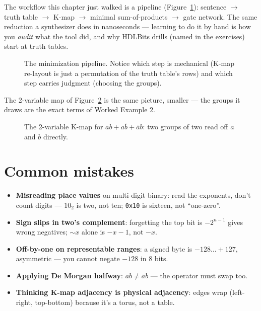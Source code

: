 The workflow this chapter just walked is a pipeline
(Figure~\ref{fig:pipeline}): sentence $\to$ truth table $\to$ K-map
$\to$ minimal sum-of-products $\to$ gate network. The same reduction a
synthesizer does in nanoseconds — learning to do it by hand is how you
\emph{audit} what the tool did, and why HDLBits drills (named in the
exercises) start at truth tables.

\begin{figure}[htbp]
\centering

\caption{The minimization pipeline. Notice which step is mechanical
(K-map re-layout is just a permutation of the truth table's rows) and
which step carries judgment (choosing the groups).}
\label{fig:pipeline}
\end{figure}

The 2-variable map of Figure~\ref{fig:kmap2} is the same picture,
smaller — the groups it draws are the exact terms of Worked Example 2.

\begin{figure}[htbp]
\centering

\caption{The 2-variable K-map for $ab+a\bar b+\bar ab$: two groups of two
read off $a$ and $b$ directly.}
\label{fig:kmap2}
\end{figure}

\section{Common mistakes}
\label{sec:mistakes08}

\begin{itemize}
\item \textbf{Misreading place values} on multi-digit binary: read the
exponents, don't count digits — $10_2$ is two, not ten; \texttt{0x10} is
sixteen, not ``one-zero''.
\item \textbf{Sign slips in two's complement}: forgetting the top bit is
$-2^{n-1}$ gives wrong negatives; $\sim x$ alone is $-x-1$, not $-x$.
\item \textbf{Off-by-one on representable ranges}: a signed byte is
$-128\ldots+127$, asymmetric — you cannot negate $-128$ in 8 bits.
\item \textbf{Applying De Morgan halfway}: $\overline{ab}\ne\bar a\bar b$
— the operator must swap too.
\item \textbf{Thinking K-map adjacency is physical adjacency}: edges wrap
(left-right, top-bottom) because it's a torus, not a table.
\end{itemize}

